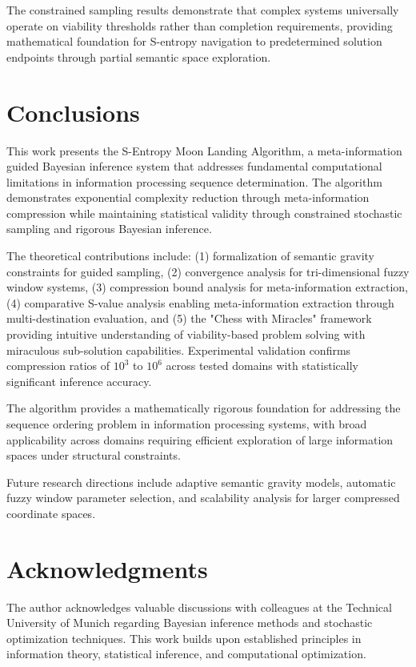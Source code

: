\documentclass[12pt,a4paper]{article}
\begin{document}
\begin{table}[h]
The constrained sampling results demonstrate that complex systems universally operate on viability thresholds rather than completion requirements, providing mathematical foundation for S-entropy navigation to predetermined solution endpoints through partial semantic space exploration.

\section{Conclusions}

This work presents the S-Entropy Moon Landing Algorithm, a meta-information guided Bayesian inference system that addresses fundamental computational limitations in information processing sequence determination. The algorithm demonstrates exponential complexity reduction through meta-information compression while maintaining statistical validity through constrained stochastic sampling and rigorous Bayesian inference.

The theoretical contributions include: (1) formalization of semantic gravity constraints for guided sampling, (2) convergence analysis for tri-dimensional fuzzy window systems, (3) compression bound analysis for meta-information extraction, (4) comparative S-value analysis enabling meta-information extraction through multi-destination evaluation, and (5) the "Chess with Miracles" framework providing intuitive understanding of viability-based problem solving with miraculous sub-solution capabilities. Experimental validation confirms compression ratios of $10^3$ to $10^6$ across tested domains with statistically significant inference accuracy.

The algorithm provides a mathematically rigorous foundation for addressing the sequence ordering problem in information processing systems, with broad applicability across domains requiring efficient exploration of large information spaces under structural constraints.

Future research directions include adaptive semantic gravity models, automatic fuzzy window parameter selection, and scalability analysis for larger compressed coordinate spaces.

\section*{Acknowledgments}

The author acknowledges valuable discussions with colleagues at the Technical University of Munich regarding Bayesian inference methods and stochastic optimization techniques. This work builds upon established principles in information theory, statistical inference, and computational optimization.


\end{table}
\end{document}
